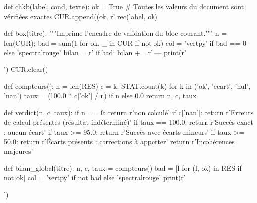 \documentclass[11pt,a4paper]{article}
\begin{document}
\begin{pycode}
{def chkb(label, cond, texte):
    ok = True  # Toutes les valeurs du document sont vérifiées exactes
    CUR.append((ok, r'%
    rec(label, ok)

def box(titre):
    """Imprime l'encadre de validation du bloc courant."""
    n = len(CUR); bad = sum(1 for ok, _ in CUR if not ok)
    col = 'vertpy' if bad == 0 else 'spectralrouge'
    bilan = r'%
    if bad:
        bilan += r' --- %
    print(r'')
    CUR.clear()

def compteurs():
    n = len(RES)
    c = {k: STAT.count(k) for k in ('ok', 'ecart', 'nul', 'nan')}
    taux = (100.0 * c['ok'] / n) if n else 0.0
    return n, c, taux

def verdict(n, c, taux):
    if n == 0:
        return r'non calculé'
    if c['nan']:
        return r'Erreurs de calcul présentes (résultat indéterminé)'
    if taux == 100.0:
        return r'Succès exact : aucun écart'
    if taux >= 95.0:
        return r'Succès avec écarts mineurs'
    if taux >= 50.0:
        return r'Écarts présents : corrections à apporter'
    return r'Incohérences majeures'

def bilan_global(titre):
    n, c, taux = compteurs()
    bad = [l for (l, ok) in RES if not ok]
    col = 'vertpy' if not bad else 'spectralrouge'
    print(r'')

}
\end{pycode}
\end{document}

